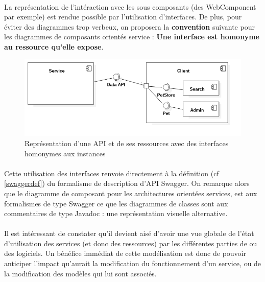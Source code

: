        \paragraph{}
            La représentation de l'intéraction avec les sous composants (des WebComponent par exemple)
            est rendue possible par l'utilisation d'interfaces. De plus, pour éviter des diagrammes
            trop verbeux, on proposera la \textbf{convention} suivante pour les diagrammes de composants
            orientés service : \textbf{Une interface est homonyme au ressource qu'elle expose}.

        \begin{figure}[h]
            \centering
            \includegraphics[scale=0.6]{./assets/UML/component2.png}
            \caption{Représentation d'une API et de ses ressources avec des interfaces homonymes aux instances}
        \end{figure}

        \paragraph{}
            Cette utilisation des interfaces renvoie directement à la définition (cf \ref{swaggerdef})
            du formalisme de description d'API Swagger. On remarque alors que le diagramme de composant pour
            les architectures orientées services, est aux formalismes de type Swagger ce que les diagrammes
            de classes sont aux commentaires de type Javadoc : une représentation visuelle alternative.

        \paragraph{}
            Il est intéressant de constater qu'il devient aisé d'avoir une vue globale de l'état
            d'utilisation des services (et donc des ressources) par les différentes parties de ou des
            logiciels. Un bénéfice immédiat de cette modélisation est donc de pouvoir anticiper l'impact
            qu'aurait la modification du fonctionnement d'un service, ou de la modification des modèles
            qui lui sont associés.

